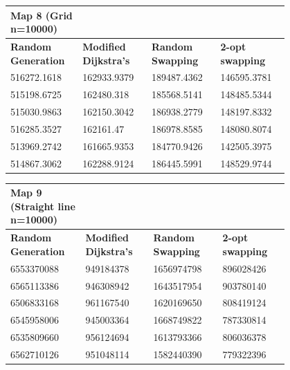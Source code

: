 \documentclass{article}
\begin{document}
\begin{table}[H]
    \centering
    \begin{tabular}{|p{0.2\linewidth}|p{0.2\linewidth}|p{0.2\linewidth}|p{0.2\linewidth}|}
    \hline
        \textbf{Map 8 (Grid n=10000)} & ~ & ~ & ~ \\ \hline
        \textbf{Random Generation} & \textbf{Modified Dijkstra's} & \textbf{Random Swapping} & \textbf{2-opt swapping} \\ \hline
        516272.1618 & 162933.9379 & 189487.4362 & 146595.3781 \\ \hline
        515198.6725 & 162480.318 & 185568.5141 & 148485.5344 \\ \hline
        515030.9863 & 162150.3042 & 186938.2779 & 148197.8332 \\ \hline
        516285.3527 & 162161.47 & 186978.8585 & 148080.8074 \\ \hline
        513969.2742 & 161665.9353 & 184770.9426 & 142505.3975 \\ \hline
        514867.3062 & 162288.9124 & 186445.5991 & 148529.9744 \\ \hline
    \end{tabular}
\end{table}

\begin{table}[H]
    \centering
    \begin{tabular}{|p{0.2\linewidth}|p{0.2\linewidth}|p{0.2\linewidth}|p{0.2\linewidth}|}
    \hline
        \textbf{Map 9 (Straight line n=10000)} & ~ & ~ & ~ \\ \hline
        \textbf{Random Generation} & \textbf{Modified Dijkstra's} & \textbf{Random Swapping} & \textbf{2-opt swapping} \\ \hline
        6553370088 & 949184378 & 1656974798 & 896028426 \\ \hline
        6565113386 & 946308942 & 1643517954 & 903780140 \\ \hline
        6506833168 & 961167540 & 1620169650 & 808419124 \\ \hline
        6545958006 & 945003364 & 1668749822 & 787330814 \\ \hline
        6535809660 & 956124694 & 1613793366 & 806036378 \\ \hline
        6562710126 & 951048114 & 1582440390 & 779322396 \\ \hline
    \end{tabular}
\end{table}
\end{document}
